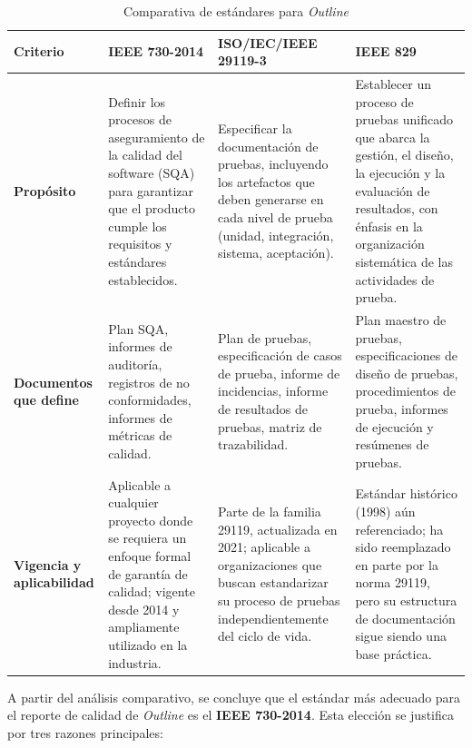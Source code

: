 \documentclass[12pt, letterpaper]{article}
\begin{document}
\begin{table}[H]
\centering
\caption{Comparativa de estándares para \textit{Outline}}
\label{tab:estandares}
\begin{tabular}{|>{\raggedright\arraybackslash}p{3cm}|>{\raggedright\arraybackslash}p{3.2cm}|>{\raggedright\arraybackslash}p{3.2cm}|>{\raggedright\arraybackslash}p{3.2cm}|}
\hline
\textbf{Criterio} & \textbf{IEEE 730-2014} & \textbf{ISO/IEC/IEEE 29119-3} & \textbf{IEEE 829} \\
\hline
\textbf{Propósito} & Definir los procesos de aseguramiento de la calidad del software (SQA) para garantizar que el producto cumple los requisitos y estándares establecidos. & Especificar la documentación de pruebas, incluyendo los artefactos que deben generarse en cada nivel de prueba (unidad, integración, sistema, aceptación). & Establecer un proceso de pruebas unificado que abarca la gestión, el diseño, la ejecución y la evaluación de resultados, con énfasis en la organización sistemática de las actividades de prueba. \\
\hline
\textbf{Documentos que define} & Plan SQA, informes de auditoría, registros de no conformidades, informes de métricas de calidad. & Plan de pruebas, especificación de casos de prueba, informe de incidencias, informe de resultados de pruebas, matriz de trazabilidad. & Plan maestro de pruebas, especificaciones de diseño de pruebas, procedimientos de prueba, informes de ejecución y resúmenes de pruebas. \\
\hline
\textbf{Vigencia y aplicabilidad} & Aplicable a cualquier proyecto donde se requiera un enfoque formal de garantía de calidad; vigente desde 2014 y ampliamente utilizado en la industria. & Parte de la familia 29119, actualizada en 2021; aplicable a organizaciones que buscan estandarizar su proceso de pruebas independientemente del ciclo de vida. & Estándar histórico (1998) aún referenciado; ha sido reemplazado en parte por la norma 29119, pero su estructura de documentación sigue siendo una base práctica. \\
\hline
\end{tabular}
\end{table}

A partir del análisis comparativo, se concluye que el estándar más adecuado para el reporte de calidad de \textit{Outline} es el \textbf{IEEE 730-2014}. Esta elección se justifica por tres razones principales:
\end{document}
